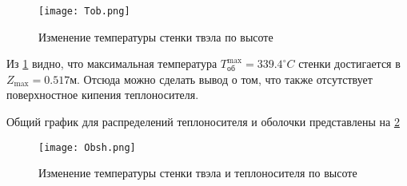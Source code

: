 \begin{figure}[H]
	\begin{center}
		\texttt{[image: Tob.png]}
		\caption{Изменение температуры стенки твэла по высоте}
		\label{pic:Tob} %
	\end{center}
\end{figure}

 Из \ref{pic:Tob} видно, что максимальная температура $T_{\text{об}}^{\max} = 339.4 ^\circ C $ стенки достигается в $Z_{\max} = 0.517 м$. Отсюда можно сделать вывод о том, что также отсутствует поверхностное кипения теплоносителя.

Общий график для распределений теплоносителя и оболочки представлены на \ref{pic:obsh}

\begin{figure}[H]
	\begin{center}
		\texttt{[image: Obsh.png]}
		\caption{Изменение температуры стенки твэла и теплоносителя по высоте}
		\label{pic:obsh} %
	\end{center}
\end{figure}
    

